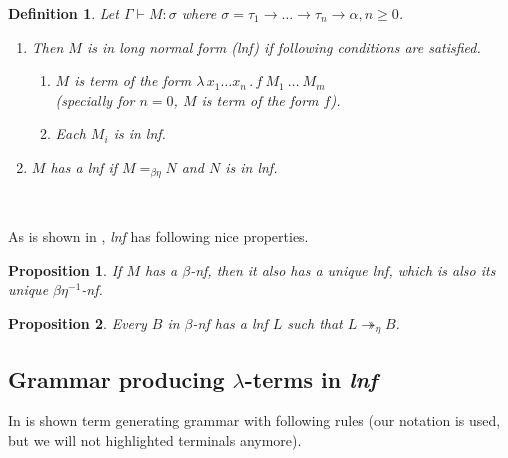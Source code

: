 \documentclass{sig-alternate}
\newtheorem{definition}{Definition}
\newtheorem{proposition}{Proposition}
\newcommand{\lterms}{$\lambda$-terms\xspace}
\newcommand{\turst}[3]{$#1\vdash{}#2:#3$\xspace}
\newcommand{\GMS}{\turst{\Gamma}{M}{\sigma}}
\newcommand{\lam}[2]{\lambda \, #1 \, . \, #2}
\newcommand{\bnf}{$\beta$-\textit{nf}\xspace}
\newcommand{\beenf}{$\beta\eta^{-1}$-\textit{nf}\xspace}
\newcommand{\lnf}{\textit{lnf}\xspace}
\newcommand{\ar}{\rightarrow\xspace}
\begin{document}

\begin{definition}
Let \GMS where 
$\sigma = \tau_1 \ar \dots \ar \tau_n \ar \alpha, n \geq 0$.
	\begin{enumerate}
	  \item	
		Then $M$ is in \textit{long normal form} (\lnf) if following 
		conditions are satisfied.
		\begin{enumerate}
		 \item $M$ is term of the form $\lam{x_1 \dots x_n}{f~M_1~\dots~M_m}$\\
		  (specially for $n = 0$, $M$ is term of the form $f$).
		 \item Each $M_i$ is in \lnf.
		\end{enumerate}	
	  \item 
	    $M$ has a \lnf if $M =_{\beta\eta} N$ and $N$ is in \lnf.
	\end{enumerate}
\end{definition}~

As is shown in \cite{barendregt10}, \lnf has following nice properties.

\begin{proposition}
If $M$ has a \bnf, 
then it also has a unique \lnf, 
which is also its unique \beenf.
\end{proposition}

\begin{proposition}
Every $B$ in \bnf has a \lnf 
$L$ such that $L \twoheadrightarrow_{\eta} B$.
\end{proposition}


\subsection{Grammar producing \lterms in \lnf}

In \cite{barendregt10} is shown term generating grammar with 
following rules (our notation is used, but we will not 
highlighted terminals anymore).

\end{document}
